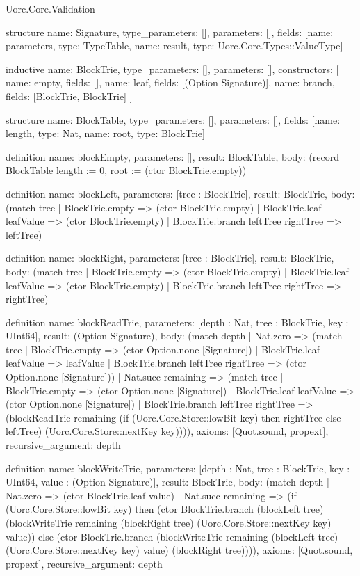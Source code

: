 \begin{lexlean}{Uorc.Core.Validation}
\begin{semanticmodule}
structure{
  name: Signature,
  type_parameters: [],
  parameters: [],
  fields: [{name: parameters, type: TypeTable}, {name: result, type: Uorc.Core.Types::ValueType}]
}

inductive{
  name: BlockTrie,
  type_parameters: [],
  parameters: [],
  constructors: [
    {name: empty, fields: []},
    {name: leaf, fields: [(Option Signature)]},
    {name: branch, fields: [BlockTrie, BlockTrie]}
  ]
}

structure{
  name: BlockTable,
  type_parameters: [],
  parameters: [],
  fields: [{name: length, type: Nat}, {name: root, type: BlockTrie}]
}

definition{
  name: blockEmpty,
  parameters: [],
  result: BlockTable,
  body: (record BlockTable {length := 0, root := (ctor BlockTrie.empty)})
}

definition{
  name: blockLeft,
  parameters: [tree : BlockTrie],
  result: BlockTrie,
  body: (match tree
    | BlockTrie.empty => (ctor BlockTrie.empty)
    | BlockTrie.leaf leafValue => (ctor BlockTrie.empty)
    | BlockTrie.branch leftTree rightTree => leftTree)
}

definition{
  name: blockRight,
  parameters: [tree : BlockTrie],
  result: BlockTrie,
  body: (match tree
    | BlockTrie.empty => (ctor BlockTrie.empty)
    | BlockTrie.leaf leafValue => (ctor BlockTrie.empty)
    | BlockTrie.branch leftTree rightTree => rightTree)
}

definition{
  name: blockReadTrie,
  parameters: [depth : Nat, tree : BlockTrie, key : UInt64],
  result: (Option Signature),
  body: (match depth
    | Nat.zero => (match tree
      | BlockTrie.empty => (ctor Option.none [Signature])
      | BlockTrie.leaf leafValue => leafValue
      | BlockTrie.branch leftTree rightTree => (ctor Option.none [Signature]))
    | Nat.succ remaining => (match tree
      | BlockTrie.empty => (ctor Option.none [Signature])
      | BlockTrie.leaf leafValue => (ctor Option.none [Signature])
      | BlockTrie.branch leftTree rightTree => (blockReadTrie remaining (if (Uorc.Core.Store::lowBit key) then rightTree else leftTree) (Uorc.Core.Store::nextKey key)))),
  axioms: [Quot.sound, propext],
  recursive_argument: depth
}

definition{
  name: blockWriteTrie,
  parameters: [depth : Nat, tree : BlockTrie, key : UInt64, value : (Option Signature)],
  result: BlockTrie,
  body: (match depth
    | Nat.zero => (ctor BlockTrie.leaf value)
    | Nat.succ remaining => (if (Uorc.Core.Store::lowBit key) then (ctor BlockTrie.branch (blockLeft tree) (blockWriteTrie remaining (blockRight tree) (Uorc.Core.Store::nextKey key) value)) else (ctor BlockTrie.branch (blockWriteTrie remaining (blockLeft tree) (Uorc.Core.Store::nextKey key) value) (blockRight tree)))),
  axioms: [Quot.sound, propext],
  recursive_argument: depth
}


\end{semanticmodule}
\end{lexlean}
